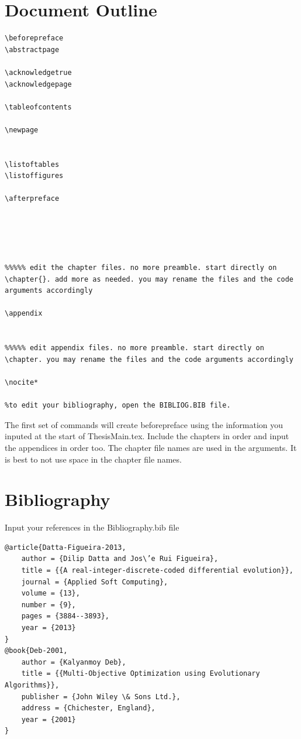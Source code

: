\section{Document Outline}
\begin{verbatim} 
\beforepreface  
\abstractpage

\acknowledgetrue
\acknowledgepage

\tableofcontents

\newpage


\listoftables
\listoffigures

\afterpreface





%%%%% edit the chapter files. no more preamble. start directly on \chapter{}. add more as needed. you may rename the files and the code arguments accordingly

\appendix


%%%%% edit appendix files. no more preamble. start directly on \chapter. you may rename the files and the code arguments accordingly

\nocite*

%to edit your bibliography, open the BIBLIOG.BIB file.
\end{verbatim}

The first set of commands will create beforepreface using the information you inputed at the start of ThesisMain.tex.  Include the chapters in order and input the appendices in order too.  The chapter file names are used in the arguments. It is best to not use space in the chapter file names.

\section{Bibliography}

Input your references in the Bibliography.bib file

\begin{verbatim}
@article{Datta-Figueira-2013,
	author = {Dilip Datta and Jos\’e Rui Figueira},
	title = {{A real-integer-discrete-coded differential evolution}},
	journal = {Applied Soft Computing},
	volume = {13},
	number = {9},
	pages = {3884--3893},
	year = {2013}
}
@book{Deb-2001,
	author = {Kalyanmoy Deb},
	title = {{Multi-Objective Optimization using Evolutionary Algorithms}},
	publisher = {John Wiley \& Sons Ltd.},
	address = {Chichester, England},
	year = {2001}
}
\end{verbatim}

